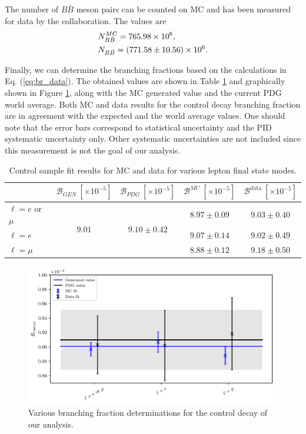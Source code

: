 The number of $B\bar B$ meson pairs can be counted on MC and has been measured for data by the collaboration. The values are
\begin{align*}
&N_{B\bar B}^{MC} = 765.98\times 10^{6},\\
&N_{B\bar B} = (771.58 \pm 10.56)\times 10^{6}.
\end{align*}

Finally, we can determine the branching fractions based on the calculations in Eq. (\ref{eq:br_data}). The obtained values are shown in Table \ref{tab:br_result} and graphically shown in Figure \ref{fig:br_plot}, along with the MC generated value and the current PDG world average. Both MC and data results for the control decay branching fraction are in agreement with the expected and the world average values. One should note that the error bars correspond to statistical uncertainty and the PID systematic uncertainty only. Other systematic uncertainties are not included since this measurement is not the goal of our analysis.

\begin{table}[H]
	\centering
	\begin{tabular}{l|c|c|c|c}
		& $\mathcal{B}_{GEN}~[\times 10^{-5}]$ & $\mathcal{B}_{PDG}~[\times 10^{-5}]$ & $\mathcal{B}^{MC}~[\times 10^{-5}]$ & $\mathcal{B}^{\mathrm{data}}~[\times 10^{-5}]$ \\
		\toprule
		$\ell = e$ or $\mu$ & \multirow{3}{*}{$9.01$} & \multirow{3}{*}{$9.10\pm0.42$} & $8.97\pm0.09$ & $9.03\pm0.40$\\
		$\ell = e$ & & & $9.07\pm0.14$ & $9.02\pm0.49$ \\
		$\ell = \mu$  & & & $8.88\pm0.12$ & $9.18\pm0.50$\\
		\bottomrule
	\end{tabular}
	\captionsetup{width=.8\linewidth}
	\caption{Control sample fit results for MC and data for various lepton final state modes.}
	\label{tab:br_result}
\end{table}

\begin{figure}[H]
	\centering
	\captionsetup{width=0.8\linewidth}
	\includegraphics[width=\linewidth]{fig/br_plot}
	\caption{Various branching fraction determinations for the control decay of our analysis.}
	\label{fig:br_plot}
\end{figure}

